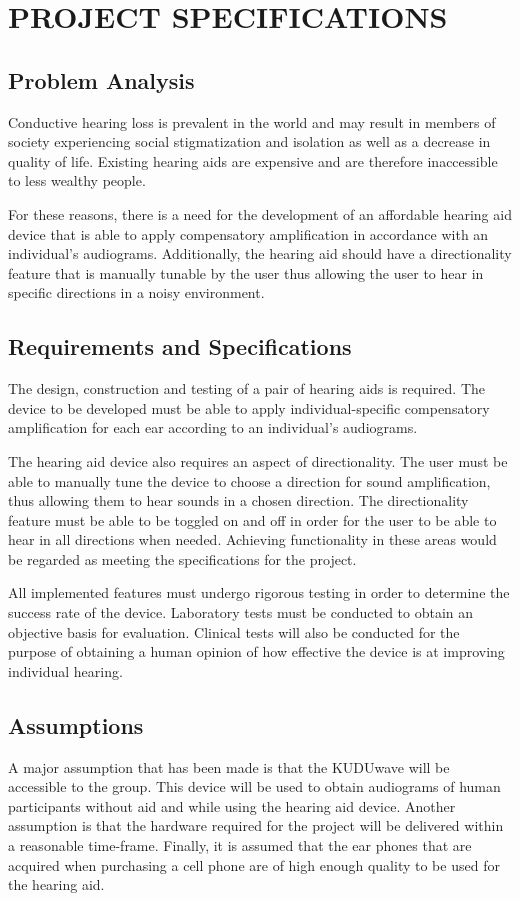 \documentclass[10pt,twocolumn]{witseiepaper}
\begin{document}
\section{PROJECT SPECIFICATIONS}
\subsection{Problem Analysis}
Conductive hearing loss is prevalent in the world and may result in members of society experiencing social stigmatization and isolation as well as a decrease in quality of life. Existing hearing aids are expensive and are therefore inaccessible to less wealthy people.

For these reasons, there is a need for the development of an affordable hearing aid device that is able to apply compensatory amplification in accordance with an individual's audiograms. Additionally, the hearing aid should have a directionality feature that is manually tunable by the user thus allowing the user to hear in specific directions in a noisy environment. 

\subsection{Requirements and Specifications}
The design, construction and testing of a pair of hearing aids is required. The device to be developed must be able to apply individual-specific compensatory amplification for each ear according to an individual's audiograms. 

The hearing aid device also requires an aspect of directionality. The user must be able to manually tune the device to choose a direction for sound amplification, thus allowing them to hear sounds in a chosen direction. The directionality feature must be able to be toggled on and off in order for the user to be able to hear in all directions when needed. Achieving functionality in these areas would be regarded as meeting the specifications for the project. 

All implemented features must undergo rigorous testing in order to determine the success rate of the device. Laboratory tests must be conducted to obtain an objective basis for evaluation. Clinical tests will also be conducted for the purpose of obtaining a human opinion of how effective the device is at improving individual hearing. 

\subsection{Assumptions}
A major assumption that has been made is that the KUDUwave will be accessible to the group. This device will be used to obtain audiograms of human participants without aid and while using the hearing aid device. Another assumption is that the hardware required for the project will be delivered within a reasonable time-frame. Finally, it is assumed that the ear phones that are acquired when purchasing a cell phone are of high enough quality to be used for the hearing aid.
\end{document}
